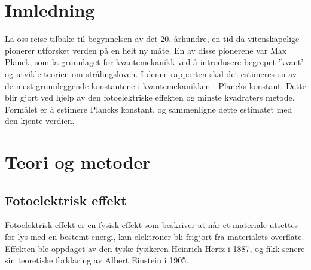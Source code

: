 \documentclass[twocolumn, 11pt]{article} %
\begin{document}
\section{Innledning} 
La oss reise tilbake til begynnelsen av det 20. århundre, en tid da vitenskapelige pionerer utforsket verden på en helt ny måte. En av disse pionerene var Max Planck, som la grunnlaget for kvantemekanikk ved å introdusere begrepet 'kvant' og utvikle teorien om strålingsloven. I denne rapporten skal det estimeres en av de mest grunnleggende konstantene i kvantemekanikken - Plancks konstant. Dette blir gjort ved hjelp av den fotoelektriske effekten og minste kvadraters metode. Formålet er å estimere Plancks konstant, og sammenligne dette estimatet med den kjente verdien. 
    
\section{Teori og metoder}

\subsection{Fotoelektrisk effekt}
Fotoelektrisk effekt er en fysisk effekt som beskriver at når et materiale utsettes for lys med en bestemt energi, kan elektroner bli frigjort fra materialets overflate. Effekten ble oppdaget av den tyske fysikeren Heinrich Hertz i 1887, og fikk senere sin teoretiske forklaring av Albert Einstein i 1905.
\end{document}

